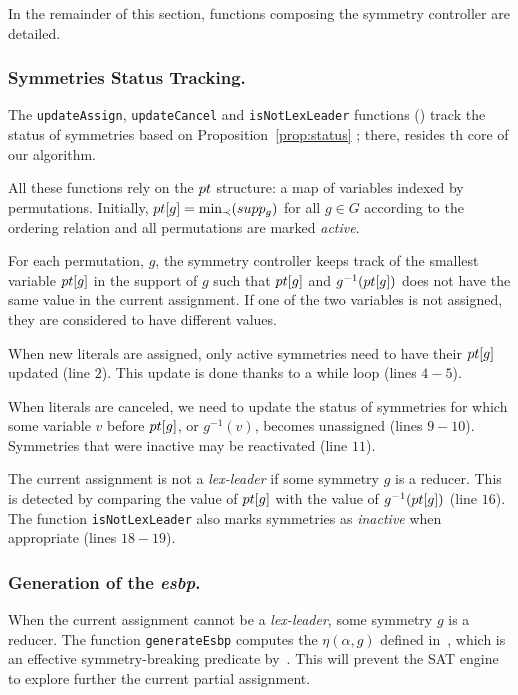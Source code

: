  \medskip\noindent In the remainder of this section, functions
 composing the symmetry controller are detailed.
 
 \subsubsection{Symmetries Status Tracking.} The \texttt{updateAssign},
 \texttt{updateCancel} and \texttt{isNot\-LexLeader} functions () track the status of symmetries based on
 Proposition~\ref{prop:status} ; there, resides th  core of our algorithm.
 
 All these functions rely on the $pt$ structure: a map of variables indexed
 by permutations. Initially, $pt[g] = \min_{\prec}(supp_g)$ for all $g \in G$ according to the ordering relation and all
 permutations are marked \textit{active}.
 
 For each permutation, $g$, the symmetry controller keeps track of the smallest
 variable $pt[g]$ in the support of $g$ such that $pt[g]$ and
 $g^{-1}(pt[g])$ does not have the same value in the current assignment. If
 one of the two variables is not assigned, they are considered  to have different values.
 
 When new literals are assigned, only active symmetries need to have their
 $pt[g]$ updated (line $2$). This update is done thanks to a while
 loop (lines $4-5$).
 
 When literals are canceled, we need to update the status of symmetries for
 which some variable $v$ before $pt[g]$, or $g^{-1}(v)$, becomes unassigned
 (lines $9-10$). Symmetries that were inactive may be reactivated (line $11$).
 
 The current assignment is not a \textit{lex-leader} if some symmetry $g$ is a
 reducer. This is detected by comparing the value of $pt[g]$ with the value
 of $g^{-1}(pt[g])$ (line $16$). The function \texttt{isNotLexLeader} also
 marks symmetries as \emph{inactive} when appropriate (lines $18-19$).
 
 \subsubsection{Generation of the \emph{esbp}.} When the current assignment
 cannot be a \textit{lex-leader}, some symmetry $g$ is a reducer. The function
 \texttt{generateEsbp} computes the $\eta(\alpha, g)$ defined in~,
 which is an effective symmetry-breaking predicate by~. This will
 prevent the SAT engine to explore further the current partial assignment.
 
